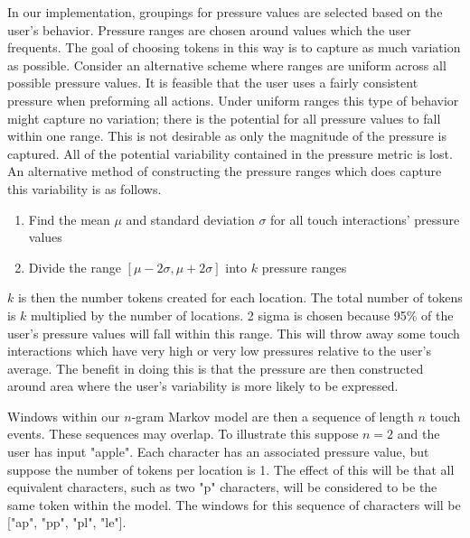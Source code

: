 In our implementation,
groupings for pressure values are selected based on the user's behavior.
Pressure ranges are chosen around values which the user frequents.
The goal of choosing tokens in this way is to capture
as much variation as possible.
%
Consider an alternative scheme where ranges are
uniform across all possible pressure values.
It is feasible that the user uses a fairly consistent
pressure when preforming all actions.
Under uniform ranges this type of behavior might 
capture no variation; there is the potential
for all pressure values to fall within one range.
This is not desirable as 
only the magnitude of the pressure is captured.
All of the potential variability contained
in the pressure metric is lost.
%
An alternative method of constructing
the pressure ranges which does capture 
this variability is as follows.
\begin{enumerate}
\item Find the mean $\mu$ and standard deviation $\sigma$ 
  for all touch interactions' pressure values
\item Divide the range $[\mu-2\sigma, \mu+2\sigma]$ into $k$ pressure ranges
\end{enumerate}
%
$k$ is then the number tokens created for each location.
The total number of tokens is $k$ multiplied by the number of locations.
2 sigma is chosen because 95\% of the user's pressure values
will fall within this range. %
This will throw away some touch interactions
which have very high or very low pressures
relative to the user's average.
The benefit in doing this is
that the pressure are then constructed around
area where the user's variability is more likely to be expressed. %

Windows within our $n$-gram Markov model are then
a sequence of length $n$ touch events.
%
These sequences may overlap.
To illustrate this suppose $n = 2$ and the user has input "apple".
Each character has an associated pressure value,
but suppose the number of tokens per location is 1.
The effect of this will be that all equivalent characters,
such as two "p" characters, 
will be considered to be the same token within the model.
The windows for this sequence of characters will be
["ap", "pp", "pl", "le"].
%

